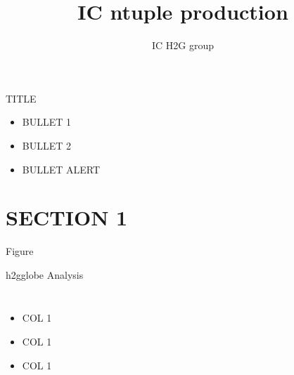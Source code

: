 \documentclass[t]{beamer}
\author{IC H2G group}
\title[IC ntuple production]{IC ntuple production}
\begin{document}


\begin{frame}{TITLE}
  \begin{itemize}  
   \item BULLET 1
   \item BULLET 2 
   \item  \alert{BULLET ALERT}
   \end{itemize}
\end{frame}

\section{SECTION 1}

\begin{frame}{Figure}
  \begin{center}
  \end{center}
\end{frame}

\begin{frame}{h2gglobe Analysis}
  \begin{columns}[c] 
  \begin{itemize}  
   \item COL 1
   \item COL 1
   \item COL 1
   \end{itemize}
  \end{columns}
\end{frame}
\end{document}
